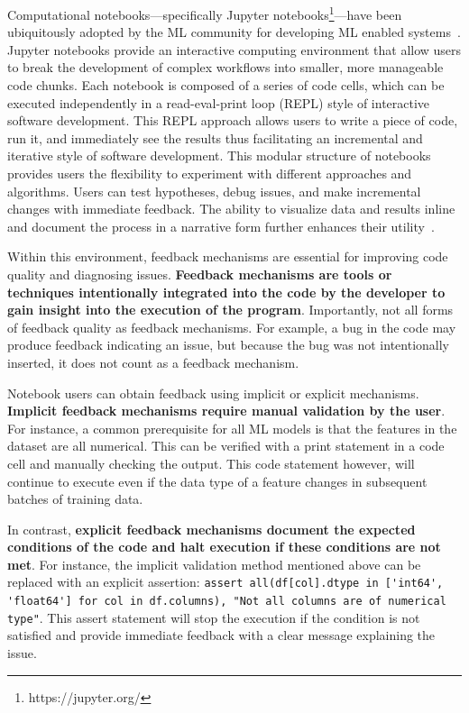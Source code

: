 \documentclass[smallextended]{svjour3}       %
\begin{document}
Computational notebooks---specifically Jupyter notebooks\footnote{https://jupyter.org/}---have been ubiquitously adopted by the ML community for developing ML enabled systems~\citep{pimentel2019large-scale,quaranta2021kgtorrent,psallidas2019data,perkel2018why}. Jupyter notebooks provide an interactive computing environment that allow users to break the development of complex workflows into smaller, more manageable code chunks. Each notebook is composed of a series of code cells, which can be executed independently in a read-eval-print loop (REPL) style of interactive software development. This REPL approach allows users to write a piece of code, run it, and immediately see the results thus facilitating an incremental and iterative style of software development. This modular structure of notebooks provides users the flexibility to experiment with different approaches and algorithms. Users can test hypotheses, debug issues, and make incremental changes with immediate feedback. The ability to visualize data and results inline and document the process in a narrative form further enhances their utility~\citep{kery2018story,head2019managing,rule2018exploration,chattopadhyay2020whats}.

Within this environment, feedback mechanisms are essential for improving code quality and diagnosing issues. \textbf{Feedback mechanisms are tools or techniques intentionally integrated into the code by the developer to gain insight into the execution of the program}. Importantly, not all forms of feedback quality as feedback mechanisms. For example, a bug in the code may produce feedback indicating an issue, but because the bug was not intentionally inserted, it does not count as a feedback mechanism.

Notebook users can obtain feedback using implicit or explicit mechanisms. \textbf{Implicit feedback mechanisms require manual validation by the user}. For instance, a common prerequisite for all ML models is that the features in the dataset are all numerical. This can be verified with a print statement in a code cell and manually checking the output. This code statement however, will continue to execute even if the data type of a feature changes in subsequent batches of training data.

In contrast, \textbf{explicit feedback mechanisms document the expected conditions of the code and halt execution if these conditions are not met}. For instance, the implicit validation method mentioned above can be replaced with an explicit assertion: \lstinline{assert all(df[col].dtype in ['int64', 'float64'] for col in df.columns), "Not all columns are of numerical type"}. This assert statement will stop the execution if the condition is not satisfied and provide immediate feedback with a clear message explaining the issue.
\end{document}
